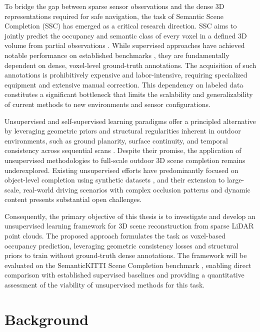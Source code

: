 \documentclass[a4paper, 12pt]{article}
\begin{document}
	To bridge the gap between sparse sensor observations and the dense 3D
	representations required for safe navigation, the task of Semantic Scene
	Completion (SSC) has emerged as a critical research direction. SSC aims to
	jointly predict the occupancy and semantic class of every voxel in a defined 3D
	volume from partial observations \cite{Song_2017_CVPR}. While supervised
	approaches have achieved notable performance on established benchmarks
	\cite{Li_2023_CVPR, 9320442, Cao_2022_CVPR}, they are fundamentally dependent
	on dense, voxel-level ground-truth annotations. The acquisition of such
	annotations is prohibitively expensive and labor-intensive, requiring
	specialized equipment and extensive manual correction. This dependency on
	labeled data constitutes a significant bottleneck that limits the scalability
	and generalizability of current methods to new environments and sensor
	configurations.
	
	Unsupervised and self-supervised learning paradigms offer a principled
	alternative by leveraging geometric priors and structural regularities inherent
	in outdoor environments, such as ground planarity, surface continuity, and
	temporal consistency across sequential scans \cite{9812507, 8793637}. Despite
	their promise, the application of unsupervised methodologies to full-scale
	outdoor 3D scene completion remains underexplored. Existing unsupervised efforts
	have predominantly focused on object-level completion using synthetic datasets
	\cite{10959142, lee2025unsupervisedpointcloudcompletion}, and their extension to
	large-scale, real-world driving scenarios with complex occlusion patterns and
	dynamic content presents substantial open challenges.
	
	Consequently, the primary objective of this thesis is to investigate and develop
	an unsupervised learning framework for 3D scene reconstruction from sparse
	LiDAR point clouds. The proposed approach formulates the task as voxel-based
	occupancy prediction, leveraging geometric consistency losses and structural
	priors to train without ground-truth dense annotations. The framework will be
	evaluated on the SemanticKITTI Scene Completion benchmark
	\cite{Behley_2019_ICCV, 10802143}, enabling direct comparison with established
	supervised baselines and providing a quantitative assessment of the viability of
	unsupervised methods for this task.
	
	\section{Background}
	
\end{document}
